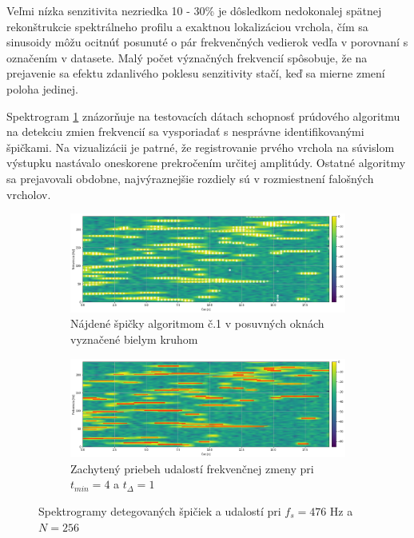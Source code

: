 Veľmi nízka senzitivita nezriedka 10 - 30\% je dôsledkom nedokonalej spätnej rekonštrukcie spektrálneho profilu a exaktnou
lokalizáciou vrchola, čím sa sinusoidy môžu ocitnúť posunuté o pár frekvenčných vedierok vedľa v porovnaní s označením v datasete.
Malý počet význačných frekvencií spôsobuje, že na prejavenie sa efektu zdanlivého poklesu senzitivity stačí, keď sa
mierne zmení poloha jedinej.

Spektrogram \ref{fig:synthetic-spectrogram} znázorňuje na testovacích dátach schopnosť prúdového algoritmu na detekciu zmien
frekvencií sa vysporiadať s nesprávne identifikovanými špičkami. Na vizualizácii je patrné, že
registrovanie prvého vrchola na súvislom výstupku nastávalo oneskorene prekročením určitej amplitúdy.
Ostatné algoritmy sa prejavovali obdobne, najvýraznejšie rozdiely sú v rozmiestnení falošných vrcholov.

\begin{figure}[h]
	\centering
     \begin{subfigure}{\textwidth}
        \centering
     	\includegraphics[width=\textwidth]{figures/verification/Sythetic-FFT-A1-476-256.png}
     	\caption{Nájdené špičky algoritmom č.1 v posuvných oknách vyznačené bielym kruhom}
     \end{subfigure}
     \begin{subfigure}{\textwidth}
    	\centering
    	\includegraphics[width=\textwidth]{figures/verification/Sythetic-A1-events.png}
   		\caption{Zachytený priebeh udalostí frekvenčnej zmeny pri $t_{min} = 4$ a $t_{\Delta} = 1$}
     \end{subfigure}
     \caption{Spektrogramy detegovaných špičiek a udalostí pri $f_s = 476$ Hz a $N = 256$}
     \label{fig:synthetic-spectrogram}
\end{figure}

